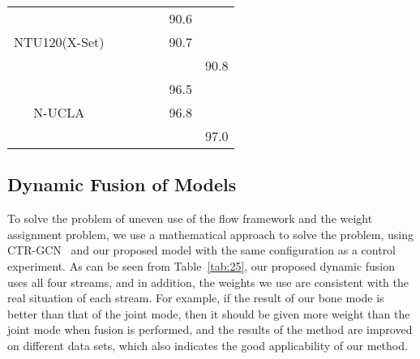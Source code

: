 \documentclass[letterpaper]{article} \usepackage[submission]{aaai23}  \usepackage{times}  \usepackage{helvet}  \usepackage{courier}  \usepackage[hyphens]{url}  \usepackage{graphicx} \urlstyle{rm} \def\UrlFont{\rm}  \usepackage{natbib}  \usepackage{caption} \frenchspacing  \setlength{\pdfpagewidth}{8.5in} \setlength{\pdfpageheight}{11in} \usepackage{algorithm}
\begin{document}
\begin{table*}[ht]
\begin{tabular}{cccclll}
\multicolumn{1}{c}{} & \multicolumn{1}{c}{} & \multicolumn{1}{c}{}  & \multicolumn{1}{c}{} & \multicolumn{1}{l}{}   & \multicolumn{1}{l}{90.6} & \multicolumn{1}{l}{}       \\ 
\multicolumn{1}{c}{{NTU120(X-Set)}}                              & \multicolumn{1}{c}{} & \multicolumn{1}{c}{}  & \multicolumn{1}{c}{} & \multicolumn{1}{l}{}   & \multicolumn{1}{l}{90.7} & \multicolumn{1}{l}{}       \\ 
\multicolumn{1}{c}{}                              & \multicolumn{1}{l}{}  & \multicolumn{1}{c}{} & \multicolumn{1}{c}{}  & \multicolumn{1}{c}{}  & \multicolumn{1}{l}{}     & \multicolumn{1}{c}{90.8}   \\ \hline

\multicolumn{1}{c}{} & \multicolumn{1}{c}{} & \multicolumn{1}{c}{}  & \multicolumn{1}{c}{} & \multicolumn{1}{l}{}   & \multicolumn{1}{l}{96.5} & \multicolumn{1}{l}{}       \\ 
\multicolumn{1}{c}{{N-UCLA}}                              & \multicolumn{1}{c}{} & \multicolumn{1}{c}{}  & \multicolumn{1}{c}{} & \multicolumn{1}{l}{}   & \multicolumn{1}{l}{96.8} & \multicolumn{1}{l}{}       \\ 
\multicolumn{1}{c}{}                              & \multicolumn{1}{l}{}  & \multicolumn{1}{c}{} & \multicolumn{1}{c}{}  & \multicolumn{1}{c}{}  & \multicolumn{1}{l}{}     & \multicolumn{1}{c}{97.0}   \\ \hline

\end{tabular}
\caption{Comparison of dynamic nonlinear fusion settings. Where  denotes the SOTA model selected to be compared, Number of Streams indicates the number of stream used, Same data set configuration indicates whether to use the previous model fusion weights, Using Dynamic Fusion indicates whether weights are dynamically assigned for different streams.}
\label{tab:25}
\end{table*}
\subsection{Dynamic Fusion of Models}
To solve the problem of uneven use of the flow framework and the weight assignment problem, we use a mathematical approach to solve the problem, using CTR-GCN~\cite{2021Channel} and our proposed model with the same configuration as a control experiment. As can be seen from Table~\ref{tab:25}, our proposed dynamic fusion uses all four streams, and in addition, the weights we use are consistent with the real situation of each stream. For example, if the result of our bone mode is better than that of the joint mode, then it should be given more weight than the joint mode when fusion is performed, and the results of the method are improved on different data sets, which also indicates the good applicability of our method.
\end{document}
